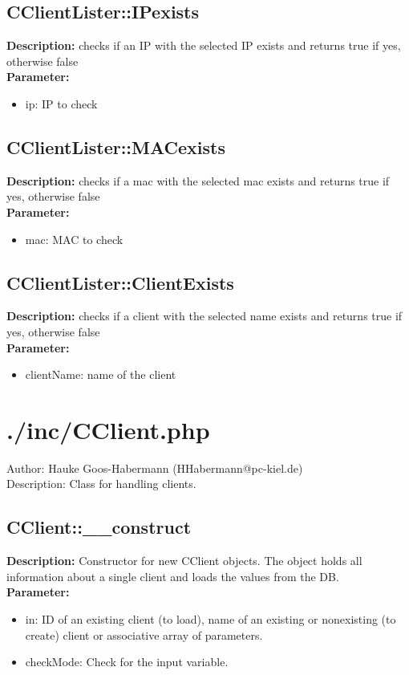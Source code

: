 \subsection{CClientLister::IPexists}
\textbf{Description:} checks if an IP with the selected IP exists and returns true if yes, otherwise false\\
\textbf{Parameter:}
\begin{itemize}
\item ip: IP to check
\end{itemize}

\subsection{CClientLister::MACexists}
\textbf{Description:} checks if a mac with the selected mac exists and returns true if yes, otherwise false\\
\textbf{Parameter:}
\begin{itemize}
\item mac: MAC to check
\end{itemize}

\subsection{CClientLister::ClientExists}
\textbf{Description:} checks if a client with the selected name exists and returns true if yes, otherwise false\\
\textbf{Parameter:}
\begin{itemize}
\item clientName: name of the client
\end{itemize}

\newpage\section{./inc/CClient.php}
 Author: Hauke Goos-Habermann (HHabermann@pc-kiel.de)\\
 Description: Class for handling clients.\\

\subsection{CClient::\_\_construct}
\textbf{Description:} Constructor for new CClient objects. The object holds all information about a single client and loads the values from the DB.\\
\textbf{Parameter:}
\begin{itemize}
\item in: ID of an existing client (to load), name of an existing or nonexisting (to create) client or associative array of parameters.
\item checkMode: Check for the input variable.
\end{itemize}

